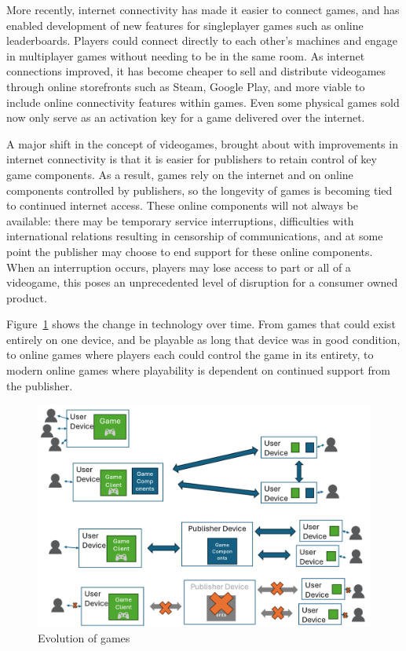 More recently, internet connectivity has made it easier to connect games, and has enabled development of new features for singleplayer games such as online leaderboards.
Players could connect directly to each other's machines and engage in multiplayer games without needing to be in the same room.
As internet connections improved, it has become cheaper to sell and distribute videogames through online storefronts such as Steam, Google Play,
and more viable to include online connectivity features within games.
Even some physical games sold now only serve as an activation key for a game delivered over the internet\cn.

A major shift in the concept of videogames, brought about with improvements in internet connectivity is that it is easier for publishers to retain control of key game components.
As a result, games rely on the internet and on online components controlled by publishers, so the longevity of games is becoming tied to continued internet access.
These online components will not always be available:
there may be temporary service interruptions,
difficulties with international relations resulting in censorship of communications,
and at some point the publisher may choose to end support for these online components.
When an interruption occurs, players may lose access to part or all of a videogame,
this poses an unprecedented level of disruption for a consumer owned product.

Figure~\ref{fig:evolution} shows the change in technology over time.
From games that could exist entirely on one device, and be playable as long that device was in good condition,
to online games where players each could control the game in its entirety,
to modern online games where playability is dependent on continued support from the publisher.

\begin{figure}
    \caption{Evolution of games}%
    \label{fig:evolution}
    \includegraphics[width=1\textwidth]{images/evolution}
\end{figure}

